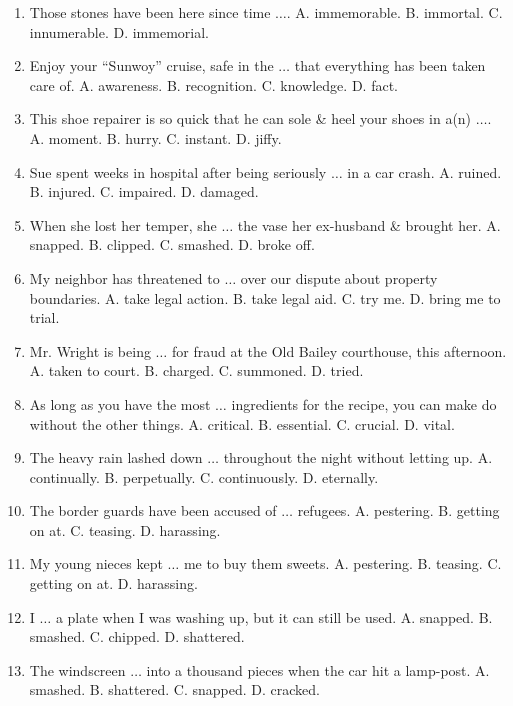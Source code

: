 \documentclass{article}
\numberwithin{equation}{section}
\begin{document}
\begin{enumerate}[leftmargin=2mm]
	\item Those stones have been here since time $\ldots$. {\sf A.} immemorable. {\sf B.} immortal. {\sf C.} innumerable. {\sf D.} immemorial.
	\item Enjoy your ``Sunwoy'' cruise, safe in the $\ldots$ that everything has been taken care of. {\sf A.} awareness. {\sf B.} recognition. {\sf C.} knowledge. {\sf D.} fact.
	\item This shoe repairer is so quick that he can sole \& heel your shoes in a(n) $\ldots$. {\sf A.} moment. {\sf B.} hurry. {\sf C.} instant. {\sf D.} jiffy.
	\item Sue spent weeks in hospital after being seriously $\ldots$ in a car crash. {\sf A.} ruined. {\sf B.} injured. {\sf C.} impaired. {\sf D.} damaged.
	\item When she lost her temper, she $\ldots$ the vase her ex-husband \& brought her. {\sf A.} snapped. {\sf B.} clipped. {\sf C.} smashed. {\sf D.} broke off.
	\item My neighbor has threatened to $\ldots$ over our dispute about property boundaries. {\sf A.} take legal action. {\sf B.} take legal aid. {\sf C.} try me. {\sf D.} bring me to trial.
	\item Mr. Wright is being $\ldots$ for fraud at the Old Bailey courthouse, this afternoon. {\sf A.} taken to court. {\sf B.} charged. {\sf C.} summoned. {\sf D.} tried.
	\item As long as you have the most $\ldots$ ingredients for the recipe, you can make do without the other things. {\sf A.} critical. {\sf B.} essential. {\sf C.} crucial. {\sf D.} vital.
	\item The heavy rain lashed down $\ldots$ throughout the night without letting up. {\sf A.} continually. {\sf B.} perpetually. {\sf C.} continuously. {\sf D.} eternally.
	\item The border guards have been accused of $\ldots$ refugees. {\sf A.} pestering. {\sf B.} getting on at. {\sf C.} teasing. {\sf D.} harassing.
	\item My young nieces kept $\ldots$ me to buy them sweets. {\sf A.} pestering. {\sf B.} teasing. {\sf C.} getting on at. {\sf D.} harassing.
	\item I $\ldots$ a plate when I was washing up, but it can still be used. {\sf A.} snapped. {\sf B.} smashed. {\sf C.} chipped. {\sf D.} shattered.
	\item The windscreen $\ldots$ into a thousand pieces when the car hit a lamp-post. {\sf A.} smashed. {\sf B.} shattered. {\sf C.} snapped. {\sf D.} cracked.

\end{enumerate}
\end{document}
